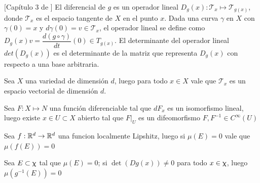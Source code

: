 \begin{definition}{[Cap\'itulo 3 de \cite{lee:00}]}
	El diferencial de $g$ es un operador lineal $D_g(x): \mathcal{T}_x \mapsto \mathcal{T}_{g (x)}$, donde $\mathcal{T}_x$ es el espacio tangente de $X$ en el punto $x$. Dada una curva $\gamma$
	en $X$ con $\gamma(0) = x$ y $d\gamma(0) = v \in \mathcal{T}_x$, el operador lineal se define como $D_g(x)v = \dfrac{d (g\circ \gamma)}{dt}(0) \in T_{g (x)}.$ El determinante del operador lineal $det (D_g (x))$ es el determinante de la matriz que representa $D_g (x)$ con respecto a una base arbitraria.
\end{definition}

\begin{proposition}
	Sea $X$ una variedad de dimensi\'on $d$, luego para todo $x \in X$ vale que $\mathcal{T}_x$ es un espacio vectorial de dimensi\'on $d$.
\end{proposition}

\begin{theorem}
	\label{theorem: Teorema de la funcion inversa}
	Sea $F: X \mapsto N$ una funci\'on diferenciable tal que $dF_x$ es un isomorfismo lineal, luego existe $x \in U \subset X$ abierto tal que $F \vert_U$ es un difeomorfismo  \eg $F, F^{-1} \in C^{\infty}(U)$
\end{theorem}

\begin{proposition}
	\label{prop: Localmente Lipshitz preserva medida}
	Sea $f : {\mathbb{R}}^d \rightarrow {\mathbb{R}}^d$ una funcion localmente Lipshitz, luego si $\mu(E) = 0$ vale que $\mu(f(E)) = 0$
\end{proposition}

\begin{lemma}
	\label{Difeomorfismos locales preservan medida cero}
	Sea $E \subset \upchi$ tal que $\mu(E) = 0$; si $\det \left(Dg(x)\right) \neq 0$ para todo $x \in \upchi$, luego $\mu\left(g^{-1}(E)\right) = 0$
\end{lemma}

